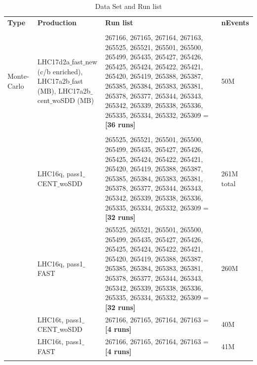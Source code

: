 \begin{table}[h]
\begin{tabular}{ p{1.2cm} | p{4.2cm} |  p{7cm} |  p{1.2cm}}
{\normalsize \textbf {Type}} &       {\normalsize \textbf {Production}} &       {\normalsize \textbf {Run list}} & {\normalsize \textbf {nEvents}} \\
\\ \hline
Monte-Carlo & LHC17d2a$\_$fast$\_$new (c/b enriched), LHC17a2b$\_$fast (MB), LHC17a2b$\_$cent$\_$woSDD (MB) &267166, 267165, 267164, 267163, 265525, 265521, 265501, 265500, 265499, 265435, 265427, 265426, 265425, 265424, 265422, 265421, 265420, 265419, 265388, 265387, 265385, 265384, 265383, 265381, 265378, 265377, 265344, 265343, 265342, 265339, 265338, 265336, 265335, 265334, 265332, 265309 = \textbf{[36 runs]} & 50M\\
\\ \hline

\multirow{7}{*}{} Data&LHC16q, pass1$\_$CENT$\_$woSDD & 265525, 265521, 265501, 265500, 265499, 265435, 265427, 265426, 265425, 265424, 265422, 265421, 265420, 265419, 265388, 265387, 265385, 265384, 265383, 265381, 265378, 265377, 265344, 265343, 265342, 265339, 265338, 265336, 265335, 265334, 265332, 265309 = \textbf{[32 runs]}& 261M total\\
                  &LHC16q, pass1$\_$FAST &265525, 265521, 265501, 265500, 265499, 265435, 265427, 265426, 265425, 265424, 265422, 265421, 265420, 265419, 265388, 265387, 265385, 265384, 265383, 265381, 265378, 265377, 265344, 265343, 265342, 265339, 265338, 265336, 265335, 265334, 265332, 265309 = \textbf{[32 runs]} & 260M \\
 & LHC16t, pass1$\_$CENT$\_$woSDD & 267166, 267165, 267164, 267163 = \textbf{[4 runs]} & 40M \\
  & LHC16t, pass1$\_$FAST & 267166, 267165, 267164, 267163 = \textbf{[4 runs]} & 41M \\
 \hline \hline
\label{tab:Sample}
\end{tabular}
\\
\caption {Data Set and Run list}
\end{table}

